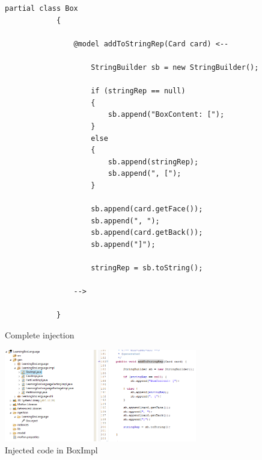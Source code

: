     \begin{figure}[htbp]
        \centering
        \begin{lstlisting}[language=Injection]
            partial class Box
            {

                @model addToStringRep(Card card) <--

                    StringBuilder sb = new StringBuilder();

                    if (stringRep == null)
                    {
                        sb.append("BoxContent: [");
                    }
                    else
                    {
                        sb.append(stringRep);
                        sb.append(", [");
                    }

                    sb.append(card.getFace());
                    sb.append(", ");
                    sb.append(card.getBack());
                    sb.append("]");

                    stringRep = sb.toString();

                -->

            }
        \end{lstlisting}
        \caption{Complete injection}
        \label{code:complete_inject_file}
    \end{figure}

    \begin{figure}[htbp]
        \centering
        \includegraphics[width=0.75\textwidth]{pics/injectionBilder/injected_code_in_impl.png}
        \caption{Injected code in BoxImpl}
        \label{fig:injected_code_in_boxImpl}
    \end{figure}